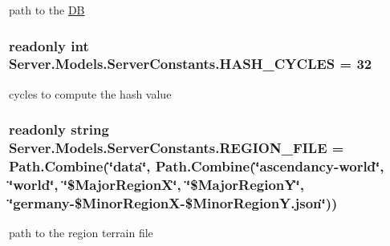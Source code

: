 path to the \hyperlink{namespaceServer_1_1DB}{D\+B} 

\hypertarget{classServer_1_1Models_1_1ServerConstants_a6b08db695329ec9edee41fa9d4275458}{}
\subsubsection[{H\+A\+S\+H\+\_\+\+C\+Y\+C\+L\+E\+S}]{\setlength{\rightskip}{0pt plus 5cm}readonly int Server.\+Models.\+Server\+Constants.\+H\+A\+S\+H\+\_\+\+C\+Y\+C\+L\+E\+S = 32\hspace{0.3cm}{\ttfamily [static]}}\label{classServer_1_1Models_1_1ServerConstants_a6b08db695329ec9edee41fa9d4275458}


cycles to compute the hash value 

\hypertarget{classServer_1_1Models_1_1ServerConstants_a5d1875e241daeed9ec89b7ab3c49d3ec}{}
\subsubsection[{R\+E\+G\+I\+O\+N\+\_\+\+F\+I\+L\+E}]{\setlength{\rightskip}{0pt plus 5cm}readonly string Server.\+Models.\+Server\+Constants.\+R\+E\+G\+I\+O\+N\+\_\+\+F\+I\+L\+E = Path.\+Combine(\char`\"{}data\char`\"{}, Path.\+Combine(\char`\"{}ascendancy-\/world\char`\"{}, \char`\"{}world\char`\"{}, \char`\"{}\$Major\+Region\+X\char`\"{}, \char`\"{}\$Major\+Region\+Y\char`\"{}, \char`\"{}germany-\/\$Minor\+Region\+X-\/\$Minor\+Region\+Y.\+json\char`\"{}))\hspace{0.3cm}{\ttfamily [static]}}\label{classServer_1_1Models_1_1ServerConstants_a5d1875e241daeed9ec89b7ab3c49d3ec}


path to the region terrain file 

\hypertarget{classServer_1_1Models_1_1ServerConstants_a2627c643caf77b36fed32b74811438f2}{}
